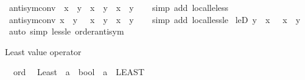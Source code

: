 \begin{isabellebody}
\endisatagproof
{\isafoldproof}%
%
\isadelimproof
\isanewline
%
\endisadelimproof
\isanewline
{}\isamarkupfalse%
\ antisym{\isacharunderscore}{\kern0pt}conv{}{\isacharcolon}{\kern0pt}\ {\isachardoublequoteopen}{\isasymnot}\ x\ {\isacharless}{\kern0pt}\ y\ {\isasymLongrightarrow}\ x\ {\isasymle}\ y\ {\isasymlongleftrightarrow}\ x\ {\isacharequal}{\kern0pt}\ y{\isachardoublequoteclose}\isanewline
%
\isadelimproof
\ \ %
\endisadelimproof
%
\isatagproof
{}\isamarkupfalse%
\ {\isacharparenleft}{\kern0pt}simp\ add{\isacharcolon}{\kern0pt}\ local{\isachardot}{\kern0pt}le{\isacharunderscore}{\kern0pt}less{\isacharparenright}{\kern0pt}%
\endisatagproof
{\isafoldproof}%
%
\isadelimproof
\isanewline
%
\endisadelimproof
\isanewline
{}\isamarkupfalse%
\ antisym{\isacharunderscore}{\kern0pt}conv{}{\isacharcolon}{\kern0pt}\ {\isachardoublequoteopen}x\ {\isasymle}\ y\ {\isasymLongrightarrow}\ {\isasymnot}\ x\ {\isacharless}{\kern0pt}\ y\ {\isasymlongleftrightarrow}\ x\ {\isacharequal}{\kern0pt}\ y{\isachardoublequoteclose}\isanewline
%
\isadelimproof
\ \ %
\endisadelimproof
%
\isatagproof
{}\isamarkupfalse%
\ {\isacharparenleft}{\kern0pt}simp\ add{\isacharcolon}{\kern0pt}\ local{\isachardot}{\kern0pt}less{\isacharunderscore}{\kern0pt}le{\isacharparenright}{\kern0pt}%
\endisatagproof
{\isafoldproof}%
%
\isadelimproof
\isanewline
%
\endisadelimproof
\isanewline
{}\isamarkupfalse%
\ leD{\isacharcolon}{\kern0pt}\ {\isachardoublequoteopen}y\ {\isasymle}\ x\ {\isasymLongrightarrow}\ {\isasymnot}\ x\ {\isacharless}{\kern0pt}\ y{\isachardoublequoteclose}\isanewline
%
\isadelimproof
\ \ %
\endisadelimproof
%
\isatagproof
{}\isamarkupfalse%
\ {\isacharparenleft}{\kern0pt}auto\ simp{\isacharcolon}{\kern0pt}\ less{\isacharunderscore}{\kern0pt}le\ order{\isachardot}{\kern0pt}antisym{\isacharparenright}{\kern0pt}%
\endisatagproof
{\isafoldproof}%
%
\isadelimproof
%
\endisadelimproof
%
\begin{isamarkuptext}%
Least value operator%
\end{isamarkuptext}\isamarkuptrue%
\isamarkupfalse%
\ {\isacharparenleft}{\kern0pt}\ ord{\isacharparenright}{\kern0pt}\isanewline
\ \ Least\ {\isacharcolon}{\kern0pt}{\isacharcolon}{\kern0pt}\ {\isachardoublequoteopen}{\isacharparenleft}{\kern0pt}{\isacharprime}{\kern0pt}a\ {\isasymRightarrow}\ bool{\isacharparenright}{\kern0pt}\ {\isasymRightarrow}\ {\isacharprime}{\kern0pt}a{\isachardoublequoteclose}\ {\isacharparenleft}{\kern0pt}\ {\isachardoublequoteopen}LEAST\ {\isachardoublequoteclose}\ {}{}{\isacharparenright}{\kern0pt}\ \isanewline

\end{isabellebody}
